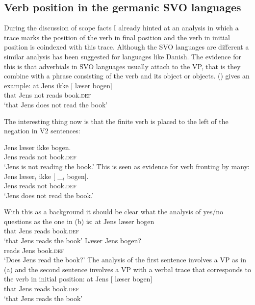 \subsection{Verb position in the germanic SVO languages}
\label{sec-danish-verb-movement}

During the discussion of scope facts I already hinted at an analysis in which a trace marks the
position of the verb in final position and the verb in initial position is coindexed with this
trace. Although the SVO languages are different a similar analysis has been suggested for languages
like Danish. The evidence for this is that adverbials in SVO languages usually attach to the VP,
that is they combine with a phrase consisting of the verb and its object or objects. () gives
an example:
\ea
\gll  at   Jens ikke [ læser bogen]\\
      that Jens not      {}        reads          book.\textsc{def}\\
\glt `that Jens does not read the book'
\z

The interesting thing now is that the finite verb is placed to the left of the negation in V2 sentences:

\ea
\gll  Jens læser ikke bogen.\\
       Jens reads   not  book.\textsc{def}\\
\glt `Jens is not reading the book.'
\z
This is seen as evidence for verb fronting by many:
\ea
\gll  Jens læser$_i$ ikke [ \_$_i$ bogen].\\
      Jens reads      not  {} {}    book.\textsc{def}\\
\glt `Jens does not read the book.'
\z
\nocite{KS2002a}

With this as a background it should be clear what the analysis of yes/no questions as the one in (b) is:
\eal
\ex
\gll at Jens læser bogen\\
     that Jens reads book.\textsc{def}\\
\glt `that Jens reads the book'
\ex\label{ex-laeser-jens-bogen}
\gll Læser Jens bogen?\\
     reads Jens book.\textsc{def}\\
\glt `Does Jens read the book?'
\zl
The analysis of the first sentence involves a VP as in (a) and the second sentence involves a
VP with a verbal trace that corresponds to the verb in initial position:
\eal
\ex
\gll at Jens [ læser bogen]\\
     that Jens {} reads book.\textsc{def}\\
\glt `that Jens reads the book'

